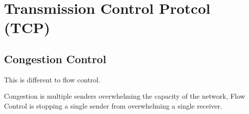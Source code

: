 \section{Transmission Control Protcol (TCP)}











\subsection{Congestion Control}

This is different to flow control.

Congestion is multiple senders overwhelming the capacity of the
network, Flow Control is stopping a single sender from overwhelming
a single receiver.

















